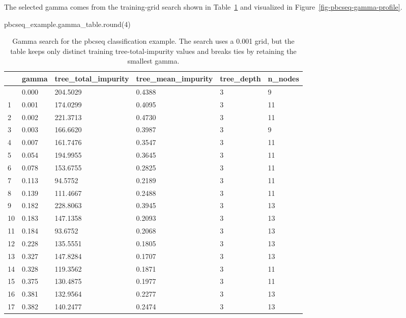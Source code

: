 \documentclass[
  letterpaper,
  DIV=11,
  numbers=noendperiod]{scrartcl}
\newenvironment{Shaded}{\begin{snugshade}}{\end{snugshade}}
\newcommand{\BuiltInTok}[1]{\textcolor[rgb]{0.00,0.23,0.31}{#1}}
\newcommand{\DecValTok}[1]{\textcolor[rgb]{0.68,0.00,0.00}{#1}}
\newcommand{\NormalTok}[1]{\textcolor[rgb]{0.00,0.23,0.31}{#1}}
\begin{document}
The selected gamma comes from the training-grid search shown in
Table~\ref{tbl-pbcseq-gamma-search} and visualized in
Figure~\ref{fig-pbcseq-gamma-profile}.

\begin{Shaded}
\begin{Highlighting}[]
\NormalTok{pbcseq\_example.gamma\_table.}\BuiltInTok{round}\NormalTok{(}\DecValTok{4}\NormalTok{)}
\end{Highlighting}
\end{Shaded}

\begin{longtable}[]{@{}llllll@{}}

\caption{\label{tbl-pbcseq-gamma-search}Gamma search for the pbcseq
classification example. The search uses a 0.001 grid, but the table
keeps only distinct training tree-total-impurity values and breaks ties
by retaining the smallest gamma.}

\tabularnewline

\toprule\noalign{}
& gamma & tree\_total\_impurity & tree\_mean\_impurity & tree\_depth &
n\_nodes \\
\midrule\noalign{}
\endhead
\bottomrule\noalign{}
\endlastfoot
0 & 0.000 & 204.5029 & 0.4388 & 3 & 9 \\
1 & 0.001 & 174.0299 & 0.4095 & 3 & 11 \\
2 & 0.002 & 221.3713 & 0.4730 & 3 & 11 \\
3 & 0.003 & 166.6620 & 0.3987 & 3 & 9 \\
4 & 0.007 & 161.7476 & 0.3547 & 3 & 11 \\
5 & 0.054 & 194.9955 & 0.3645 & 3 & 11 \\
6 & 0.078 & 153.6755 & 0.2825 & 3 & 11 \\
7 & 0.113 & 94.5752 & 0.2189 & 3 & 11 \\
8 & 0.139 & 111.4667 & 0.2488 & 3 & 11 \\
9 & 0.182 & 228.8063 & 0.3945 & 3 & 13 \\
10 & 0.183 & 147.1358 & 0.2093 & 3 & 13 \\
11 & 0.184 & 93.6752 & 0.2068 & 3 & 13 \\
12 & 0.228 & 135.5551 & 0.1805 & 3 & 13 \\
13 & 0.327 & 147.8284 & 0.1707 & 3 & 13 \\
14 & 0.328 & 119.3562 & 0.1871 & 3 & 11 \\
15 & 0.375 & 130.4875 & 0.1977 & 3 & 11 \\
16 & 0.381 & 132.9564 & 0.2277 & 3 & 13 \\
17 & 0.382 & 140.2477 & 0.2474 & 3 & 13 \\

\end{longtable}
\end{document}
